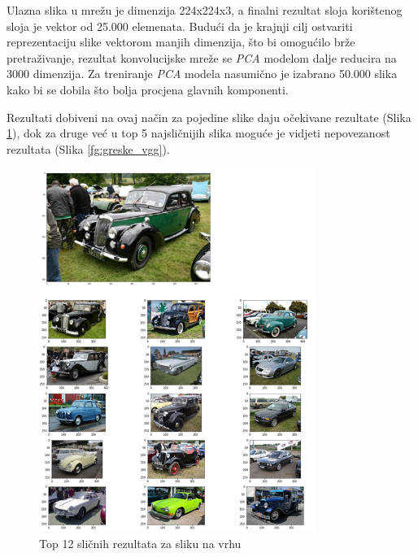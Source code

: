 \documentclass[times, utf8, proizvoljni, numeric]{fer}
\begin{document}
Ulazna slika u mrežu je dimenzija 224x224x3, a finalni rezultat sloja korištenog sloja je vektor od 25.000 elemenata. Budući da je krajnji cilj ostvariti reprezentaciju slike vektorom manjih dimenzija, što bi omogućilo brže pretraživanje, rezultat konvolucijske mreže se \textit{PCA} modelom dalje reducira na 3000 dimenzija. Za treniranje \textit{PCA} modela nasumično je izabrano 50.000 slika kako bi se dobila što bolja procjena glavnih komponenti.

Rezultati dobiveni na ovaj način za pojedine slike daju očekivane rezultate (Slika \ref{fg:auti_vgg}), dok za druge već u top 5 najsličnijih slika moguće je vidjeti nepovezanost rezultata (Slika \ref{fg:greske_vgg}). 

\begin{figure}[!ht]
	\begin{center}
		\captionsetup{justification=centering}
		\includegraphics[width=0.8\textwidth]{./imgs/auti_vgg.png}
		\caption{Top 12 sličnih rezultata za sliku na vrhu}
		\label{fg:auti_vgg}
	\end{center}
\end{figure}
\end{document}
